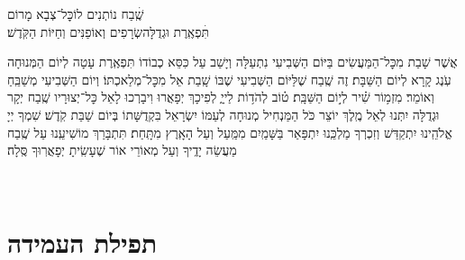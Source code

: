 שֶֽׁׄבַח נוֹתְנִים לוֹ\hfill כׇּל־צְבָא מָרוֹם \\ תִּׄפְאֶֽרֶת וּגְדֻלָּה\hfill שְׂרָפִים וְאוֹפַנִּים וְחַיּוֹת הַקֹּֽדֶשׁ׃

אֲשֶׁר שָׁבַת מִכׇּל־הַמַּעֲשִׂים בַּיּוֹם הַשְּׁבִיעִי נִתְעַלָּה וְיָשַׁב עַל כִּסֵּא כְבוֹדוֹ \middot תִּפְאֶֽרֶת עָטָה לְיוֹם הַמְּנוּחָה עֹֽנֶג קָרָא לְיוֹם הַשַּׁבָּת׃
זֶה שֶֽׁבַח שֶׁלַּיּוֹם הַשְּׁבִיעִי שֶׁבּוֹ שָֽׁבַת אֵל מִכׇּל־מְלַאכְתּוֹ׃ וְיוֹם הַשְּׁבִיעִי מְשַׁבֵּֽחַ וְאוֹמֵר׃
%
מִזְמ֥וֹר שִׁ֗יר לְי֣וֹם הַשַּׁבָּֽת׃ ט֗וֹב לְהֹד֥וֹת לַייָ֑
לְפִיכָךְ יְפָאֲרוּ וִיבָרְכוּ לָאֵל כׇּל־יְצוּרָיו \middot שֶֽׁבַח יְקָר וּגְדֻלָּה יִתְּנוּ לְאֵל מֶֽלֶךְ יוֹצֵר כֹּל \middot הַמַּנְחִיל מְנוּחָה לְעַמּוֹ יִשְׂרָאֵל בִּקְדֻשָּׁתוֹ בְּיוֹם שַׁבַּת קֹֽדֶשׁ׃
שִׁמְךָ יְיָ אֱלֹהֵֽינוּ יִתְקַדַּשׁ \middot וְזִכְרְךָ מַלְכֵּֽנוּ יִתְפָּאַר בַּשָּׁמַֽיִם מִמַּֽעַל וְעַל הָאָֽרֶץ מִתָּֽחַת׃ תִּתְבָּרַךְ מוֹשִׁיעֵֽנוּ עַל שֶֽׁבַח מַעֲשֵׂה יָדֶֽיךָ וְעַל מְאוֹרֵי אוֹר שֶׁעָשִֽׂיתָ יְפָאֲרֽוּךָ סֶּֽלָה׃


\label{tisbarach}
\yotzerhameoros

\ahavaraba

\shema

\veahavta

\vehaya

\vayomer{}

\emesveyatziv

\ezrasavoseinu

\gaalyisroel\\


\section[תפילת העמידה]{ תפילת העמידה }

\nextpage
\begin{Center}\end{Center}

